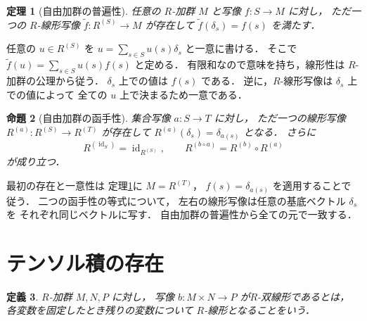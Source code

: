 \documentclass[a5paper,10pt,onecolumn]{jsarticle}
\makeatletter
\theoremstyle{mathnotetheorem}
\newtheorem{theorem}{定理}[section]
\newtheorem{definition}[theorem]{定義}
\newtheorem{proposition}[theorem]{命題}
\renewcommand{\proofname}{証明}
\renewenvironment{proof}[1][\proofname]{%
  \par\pushQED{\qed}\normalfont\topsep4\p@\@plus2\p@\relax
  \trivlist\item[\hskip\labelsep\bfseries #1]\ignorespaces
}{\popQED\endtrivlist\@endpefalse}
\makeatother
\begin{document}
\begin{theorem}[自由加群の普遍性]\label{thm:free-module}
任意の $R$-加群 $M$ と写像 $f:S\to M$ に対し，
ただ一つの $R$-線形写像
$\widetilde f:R^{(S)}\to M$ が存在して
$\widetilde f(\delta_s)=f(s)$ を満たす．
\end{theorem}
\begin{proof}
任意の $u\in R^{(S)}$ を
$u=\sum_{s\in S}u(s)\delta_s$ と一意に書ける．
そこで
$\widetilde f(u)=\sum_{s\in S}u(s)f(s)$ と定める．
有限和なので意味を持ち，線形性は
$R$-加群の公理から従う．
$\delta_s$ 上での値は $f(s)$ である．
逆に，$R$-線形写像は $\delta_s$ 上での値によって
全ての $u$ 上で決まるため一意である．
\end{proof}

\begin{proposition}[自由加群の函手性]\label{prop:free-functor}
集合写像 $a:S\to T$ に対し，
ただ一つの線形写像
$R^{(a)}:R^{(S)}\to R^{(T)}$ が存在して
$R^{(a)}(\delta_s)=\delta_{a(s)}$ となる．
さらに
\[
 R^{(\operatorname{id}_S)}
 =\operatorname{id}_{R^{(S)}},\qquad
 R^{(b\circ a)}=R^{(b)}\circ R^{(a)}
\]
が成り立つ．
\end{proposition}
\begin{proof}
最初の存在と一意性は
定理\ref{thm:free-module}に $M=R^{(T)}$，
$f(s)=\delta_{a(s)}$ を適用することで従う．
二つの函手性の等式について，
左右の線形写像は任意の基底ベクトル $\delta_s$ を
それぞれ同じベクトルに写す．
自由加群の普遍性から全ての元で一致する．
\end{proof}

\section{テンソル積の存在}

\begin{definition}
$R$-加群 $M,N,P$ に対し，
写像 $b:M\times N\to P$ が\emph{$R$-双線形}であるとは，
各変数を固定したとき残りの変数について
$R$-線形となることをいう．
\end{definition}
\end{document}
